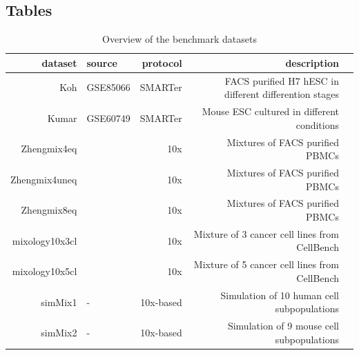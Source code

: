 \documentclass{bmcart}
\begin{document}
\begin{backmatter}

% 


\section*{Tables}

\begin{table}[h!]
\caption{Overview of the benchmark datasets}
\label{tab:table1}
\begin{tabular}{rlrrl}
  \hline
dataset & source & protocol & description \\ 
  \hline
Koh & GSE85066 & SMARTer & FACS purified H7 hESC in different differention stages \\ 
  Kumar & GSE60749 & SMARTer & Mouse ESC cultured in different conditions \\ 
  Zhengmix4eq & \citep{duoClustering2018} & 10x & Mixtures of FACS purified PBMCs \\ 
  Zhengmix4uneq & \citep{duoClustering2018} & 10x & Mixtures of FACS purified PBMCs \\ 
  Zhengmix8eq & \citep{duoClustering2018} & 10x & Mixtures of FACS purified PBMCs \\ 
  mixology10x3cl & \cite{tianMixology2018} & 10x & Mixture of 3  cancer cell lines from CellBench \\ 
  mixology10x5cl & \cite{tianMixology2018} & 10x & Mixture of 5 cancer cell lines from CellBench \\ 
  simMix1 & - & 10x-based & Simulation of 10 human cell subpopulations \\
  simMix2 & - & 10x-based & Simulation of 9 mouse cell subpopulations \\
   \hline
\end{tabular}
\end{table}


\end{backmatter}
\end{document}
